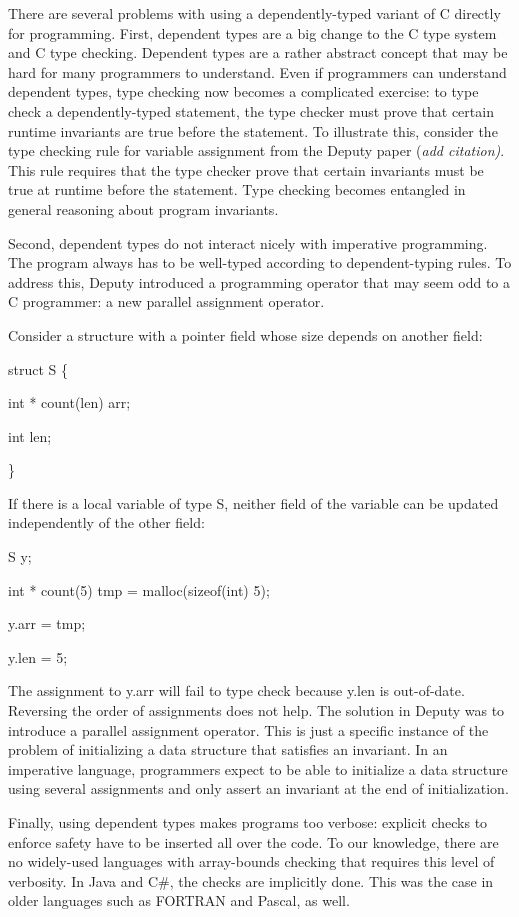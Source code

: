 \documentclass[]{article}
\begin{document}
There are several problems with using a dependently-typed variant of C
directly for programming. First, dependent types are a big change to the
C type system and C type checking. Dependent types are a rather abstract
concept that may be hard for many programmers to understand. Even if
programmers can understand dependent types, type checking now becomes a
complicated exercise: to type check a dependently-typed statement, the
type checker must prove that certain runtime invariants are true before
the statement. To illustrate this, consider the type checking rule for
variable assignment from the Deputy paper (\emph{add citation)}. This
rule requires that the type checker prove that certain invariants must
be true at runtime before the statement. Type checking becomes entangled
in general reasoning about program invariants.

Second, dependent types do not interact nicely with imperative
programming. The program always has to be well-typed according to
dependent-typing rules. To address this, Deputy introduced a programming
operator that may seem odd to a C programmer: a new parallel assignment
operator.

Consider a structure with a pointer field whose size depends on another
field:

struct S \{

int * count(len) arr;

int len;

\}

If there is a local variable of type S, neither field of the variable
can be updated independently of the other field:

S y;

int * count(5) tmp = malloc(sizeof(int) 5);

y.arr = tmp;

y.len = 5;

The assignment to y.arr will fail to type check because y.len is
out-of-date. Reversing the order of assignments does not help. The
solution in Deputy was to introduce a parallel assignment operator. This
is just a specific instance of the problem of initializing a data
structure that satisfies an invariant. In an imperative language,
programmers expect to be able to initialize a data structure using
several assignments and only assert an invariant at the end of
initialization.

Finally, using dependent types makes programs too verbose: explicit
checks to enforce safety have to be inserted all over the code. To our
knowledge, there are no widely-used languages with array-bounds checking
that requires this level of verbosity. In Java and C\#, the checks are
implicitly done. This was the case in older languages such as FORTRAN
and Pascal, as well.
\end{document}
